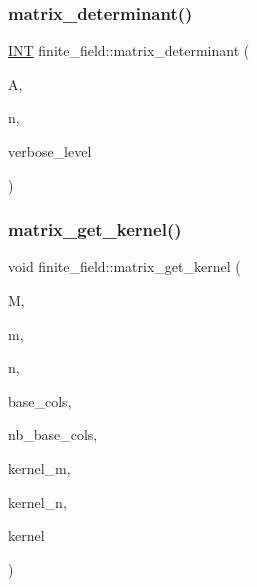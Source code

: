 \mbox{\label{classfinite__field_abeeee303bfbc054f2dcac4981ecab9ce}} 
\subsubsection{\texorpdfstring{matrix\+\_\+determinant()}{matrix\_determinant()}}
{\footnotesize\ttfamily \mbox{\hyperlink{galois_8h_a09fddde158a3a20bd2dcadb609de11dc}{I\+NT}} finite\+\_\+field\+::matrix\+\_\+determinant (\begin{DoxyParamCaption}\item[{\mbox{\hyperlink{galois_8h_a09fddde158a3a20bd2dcadb609de11dc}{I\+NT}} $\ast$}]{A,  }\item[{\mbox{\hyperlink{galois_8h_a09fddde158a3a20bd2dcadb609de11dc}{I\+NT}}}]{n,  }\item[{\mbox{\hyperlink{galois_8h_a09fddde158a3a20bd2dcadb609de11dc}{I\+NT}}}]{verbose\+\_\+level }\end{DoxyParamCaption})}

\mbox{\label{classfinite__field_ac45780a927cee936df13d04d30d2d248}} 
\subsubsection{\texorpdfstring{matrix\+\_\+get\+\_\+kernel()}{matrix\_get\_kernel()}}
{\footnotesize\ttfamily void finite\+\_\+field\+::matrix\+\_\+get\+\_\+kernel (\begin{DoxyParamCaption}\item[{\mbox{\hyperlink{galois_8h_a09fddde158a3a20bd2dcadb609de11dc}{I\+NT}} $\ast$}]{M,  }\item[{\mbox{\hyperlink{galois_8h_a09fddde158a3a20bd2dcadb609de11dc}{I\+NT}}}]{m,  }\item[{\mbox{\hyperlink{galois_8h_a09fddde158a3a20bd2dcadb609de11dc}{I\+NT}}}]{n,  }\item[{\mbox{\hyperlink{galois_8h_a09fddde158a3a20bd2dcadb609de11dc}{I\+NT}} $\ast$}]{base\+\_\+cols,  }\item[{\mbox{\hyperlink{galois_8h_a09fddde158a3a20bd2dcadb609de11dc}{I\+NT}}}]{nb\+\_\+base\+\_\+cols,  }\item[{\mbox{\hyperlink{galois_8h_a09fddde158a3a20bd2dcadb609de11dc}{I\+NT}} \&}]{kernel\+\_\+m,  }\item[{\mbox{\hyperlink{galois_8h_a09fddde158a3a20bd2dcadb609de11dc}{I\+NT}} \&}]{kernel\+\_\+n,  }\item[{\mbox{\hyperlink{galois_8h_a09fddde158a3a20bd2dcadb609de11dc}{I\+NT}} $\ast$}]{kernel }\end{DoxyParamCaption})}

